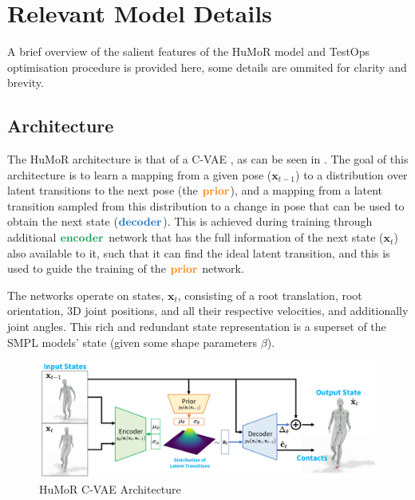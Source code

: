 \section{Relevant Model Details}

A brief overview of the salient features of the HuMoR model and TestOps optimisation procedure is provided here, some details are ommited for clarity and brevity.

\subsection{Architecture}
The HuMoR architecture is that of a C-VAE \cite{CVAE}, as can be seen in . The goal of this architecture is to learn a mapping from a given pose ($\mathbf{x}_{t-1}$) to a distribution over latent transitions to the next pose (the $\textbf{\textcolor{orange}{prior}}$), and a mapping from a latent transition sampled from this distribution to a change in pose that can be used to obtain the next state ($\textbf{\textcolor{RoyalBlue}{decoder}}$). This is achieved during training through additional $\textbf{\textcolor{ForestGreen}{encoder}}$ network that has the full information of the next state ($\textbf{x}_t$) also available to it, such that it can find the ideal latent transition, and this is used to guide the training of the $\textbf{\textcolor{orange}{prior}}$ network.

The networks operate on states, $\mathbf{x}_t$, consisting of a root translation, root orientation, 3D joint positions, and all their respective velocities, and additionally joint angles. This rich and redundant state representation is a superset of the SMPL models' state \cite{SMPL} (given some shape parameters $\beta$).

\begin{figure}[!ht]
    \centering
    \includegraphics[width=1\textwidth]{Figures/humor/model/architecture.png}
    \caption{HuMoR C-VAE Architecture \cite{humor}}
    \label{fig:humor_architecture}
\end{figure}


